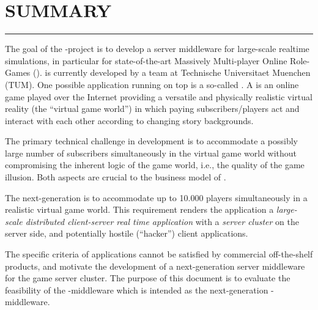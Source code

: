 \documentclass[a4paper, 10pt]{book}
\begin{document}
\newcommand{\ULTIMA}{\textsc{Ultima Online}\xspace}
\newcommand{\EVERQUEST}{\textsc{Everquest}\xspace}
\newcommand{\ASHERON}{\textsc{Asheron's Call}\xspace}
\newcommand{\ANARCHY}{\textsc{Anarchy Online}\xspace}
\newcommand{\DARKAGE}{\textsc{Dark Age of Camelot}\xspace}
\newcommand{\EARTH}{\textsc{Earth and Beyond}\xspace}


\newpage

\vspace*{4cm}

\section*{SUMMARY}

\bigskip

\hrule

\bigskip

%
%

The goal of the \SYNEIGHT-project is to develop a server middleware for
large-scale realtime simulations, in particular for state-of-the-art Massively
Multi-player Online Role-Games (\MMORGS). \SYNEIGHT is currently developed by a
team at Technische Universitaet Muenchen (TUM). One possible application
running on top \SYNEIGHT is a so-called \MMORG. A \MMORG is an online game
played over the Internet providing a versatile and physically realistic virtual
reality (the ``virtual game world'') in which paying subscribers/players act
and interact with each other according to changing story backgrounds.

The primary technical challenge in \MMORG development is 
to accommodate a possibly large number of subscribers simultaneously 
in the virtual game world without compromising the inherent logic of
the game world, i.e., the quality of the game illusion. Both aspects
are crucial to the business model of \MMORGS.

The next-generation \MMORG is to accommodate up to 10.000 players 
simultaneously in a realistic virtual game world. This requirement  renders the
\MMORG application a {\em large-scale distributed client-server real time
application} with a {\em server cluster} on the server side, and potentially
hostile (``hacker'') client applications. 

The specific criteria of \MMORG applications cannot be satisfied by 
commercial off-the-shelf products, and motivate the development
of a next-generation server middleware for the game server cluster.
The purpose of this document is to evaluate the feasibility of the
\SYNEIGHT-middleware which is intended as the next-generation
\MMORG-middleware.
\end{document}

